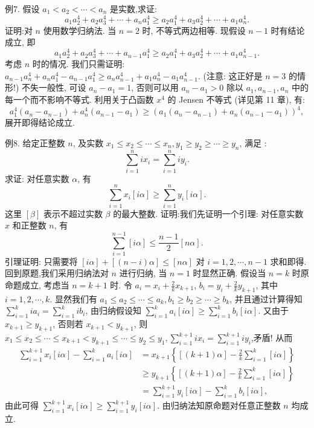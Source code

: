例7. 假设 $a_1<a_2<\cdots<a_n$ 是实数,求证:
$$
a_1 a_2^4+a_2 a_3^4+\cdots+a_n a_1^4 \geqslant a_2 a_1^4+a_3 a_2^4+\cdots+a_1 a_n^4 .
$$
证明:对 $n$ 使用数学归纳法.
当 $n=2$ 时, 不等式两边相等.
现假设 $n-1$ 时有结论成立, 即
$$
a_1 a_2^4+a_2 a_3^4+\cdots+a_{n-1} a_1^4 \geqslant a_2 a_1^4+a_3 a_2^4+\cdots+a_1 a_{n-1}^4 .
$$
考虑 $n$ 时的情况.
我们只需证明: $a_{n-1} a_n^4+a_n a_1^4-a_{n-1} a_1^4 \geqslant a_n a_{n-1}^4+a_1 a_n^4-a_1 a_{n-1}^4$. (注意: 这正好是 $n=3$ 的情形!)
不失一般性, 可设 $a_n-a_1=1$, 否则可以用 $a_n-a_1>0$ 除以 $a_1, a_{n-1}, a_n$ 中的每一个而不影响不等式.
利用关于凸函数 $x^4$ 的 Jensen 不等式 (详见第 11 章), 有:
$$
a_1^4\left(a_n-a_{n-1}\right)+a_n^4\left(a_{n-1}-a_1\right) \geqslant\left(a_1\left(a_n-a_{n-1}\right)+a_n\left(a_{n-1}-a_1\right)\right)^4,
$$
展开即得结论成立.



例8. 给定正整数 $n$, 及实数 $x_1 \leqslant x_2 \leqslant \cdots \leqslant x_n, y_1 \geqslant y_2 \geqslant \cdots \geqslant y_n$, 满足 :
$$
\sum_{i=1}^n i x_i=\sum_{i=1}^n i y_i .
$$
求证: 对任意实数 $\alpha$, 有
$$
\sum_{i=1}^n x_i[i \alpha] \geqslant \sum_{i=1}^n y_i[i \alpha] .
$$
这里 $[\beta]$ 表示不超过实数 $\beta$ 的最大整数.
证明:我们先证明一个引理: 对任意实数 $x$ 和正整数 $n$, 有
$$
\sum_{i=1}^{n-1}[i \alpha] \leqslant \frac{n-1}{2}[n \alpha] .
$$
引理证明: 只需要将 $[i \alpha]+[(n-i) \alpha] \leqslant[n \alpha]$ 对 $i=1,2, \cdots, n-1$ 求和即得.
回到原题,我们采用归纳法对 $n$ 进行归纳, 当 $n=1$ 时显然正确.
假设当 $n=k$ 时原命题成立, 考虑当 $n=k+1$ 时.
令 $a_i=x_i+\frac{2}{k} x_{k+1}$, $b_i=y_i+\frac{2}{k} y_{k+1}$, 其中 $i=1,2, \cdots, k$. 显然我们有 $a_1 \leqslant a_2 \leqslant \cdots \leqslant a_k, b_1 \geqslant b_2 \geqslant \cdots \geqslant b_k$, 并且通过计算得知 $\sum_{i=1}^k i a_i=\sum_{i=1}^k i b_i$, 由归纳假设知 $\sum_{i=1}^k a_i[i \alpha] \geqslant \sum_{i=1}^k b_i[i \alpha]$. 又由于 $x_{k+1} \geqslant y_{k+1}$, 否则若 $x_{k+1}<y_{k+1}$, 则 $x_1 \leqslant x_2 \leqslant \cdots \leqslant x_{k+1}< y_{k+1} \leqslant \cdots \leqslant y_2 \leqslant y_1, \sum_{i=1}^{k+1} i x_i=\sum_{i=1}^{k+1} i y_i$,矛盾!
从而
$$
\begin{aligned}
\sum_{i=1}^{k+1} x_i[i \alpha]-\sum_{i=1}^k a_i[i \alpha] & =x_{k+1}\left\{[(k+1) \alpha]-\frac{2}{k} \sum_{i=1}^k[i \alpha]\right\} \\
& \geqslant y_{k+1}\left\{[(k+1) \alpha]-\frac{2}{k} \sum_{i=1}^k[i \alpha]\right\} \\
& =\sum_{i=1}^{k+1} y_i[i \alpha]-\sum_{i=1}^k b_i[i \alpha],
\end{aligned}
$$
由此可得 $\sum_{i=1}^{k+1} x_i[i \alpha] \geqslant \sum_{i=1}^{k+1} y_i[i \alpha]$. 由归纳法知原命题对任意正整数 $n$ 均成立.



